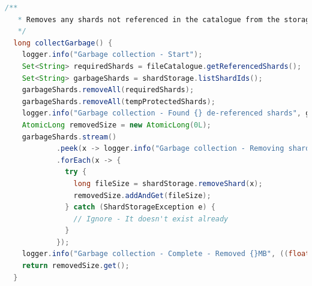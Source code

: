 \documentclass[11pt, a4paper, twocolumn, twoside]{report}
\begin{document}
\begin{lstlisting}[language=Java, caption=Garbage Collection Implementation, label=lst:fileGC]
  /**
   * Removes any shards not referenced in the catalogue from the storage.
   */
  long collectGarbage() {
    logger.info("Garbage collection - Start");
    Set<String> requiredShards = fileCatalogue.getReferencedShards();
    Set<String> garbageShards = shardStorage.listShardIds();
    garbageShards.removeAll(requiredShards);
    garbageShards.removeAll(tempProtectedShards);
    logger.info("Garbage collection - Found {} de-referenced shards", garbageShards.size());
    AtomicLong removedSize = new AtomicLong(0L);
    garbageShards.stream()
            .peek(x -> logger.info("Garbage collection - Removing shard: [{}]", x))
            .forEach(x -> {
              try {
                long fileSize = shardStorage.removeShard(x);
                removedSize.addAndGet(fileSize);
              } catch (ShardStorageException e) {
                // Ignore - It doesn't exist already
              }
            });
    logger.info("Garbage collection - Complete - Removed {}MB", ((float) removedSize.get()) / (1024 * 1024));
    return removedSize.get();
  }
\end{lstlisting}
\end{document}
